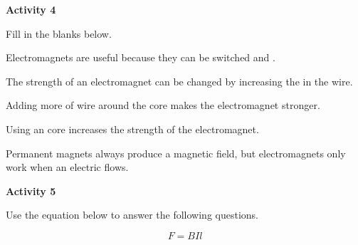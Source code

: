 \documentclass[12pt]{article}
\begin{document}
\vspace{3em}

\textbf{Activity 4}

Fill in the blanks below.

\vspace{1em}

Electromagnets are useful because they can be switched \underline{\hspace{5cm}} and \underline{\hspace{5cm}}.

\vspace{2em}

The strength of an electromagnet can be changed by increasing the \underline{\hspace{4cm}} in the wire.

\vspace{2em}

Adding more \underline{\hspace{6cm}} of wire around the core makes the electromagnet stronger.

\vspace{2em}

Using an \underline{\hspace{6cm}} core increases the strength of the electromagnet.

\vspace{2em}

Permanent magnets always produce a magnetic field, but electromagnets only work when an electric \underline{\hspace{6cm}} flows.

\newpage

\textbf{Activity 5}

Use the equation below to answer the following questions.

\[
F = B I l
\]
\end{document}
